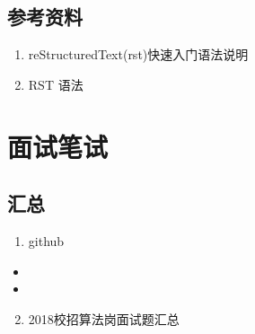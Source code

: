 \documentclass[letterpaper,10pt,english]{sphinxmanual}
\begin{document}
\subsection{参考资料}
\label{\detokenize{else/01_test_code:id1}}\begin{enumerate}
\item {} 
reStructuredText(rst)快速入门语法说明

\end{enumerate}
\begin{quote}

\end{quote}
\begin{enumerate}
\setcounter{enumi}{1}
\item {} 
RST 语法

\end{enumerate}
\begin{quote}

\end{quote}


\section{面试笔试}
\label{\detokenize{else/02_interview::doc}}\label{\detokenize{else/02_interview:id1}}

\subsection{汇总}
\label{\detokenize{else/02_interview:id2}}\begin{enumerate}
\item {} 
github

\end{enumerate}
\begin{itemize}
\item {} 

\item {} 

\end{itemize}
\begin{enumerate}
\setcounter{enumi}{1}
\item {} 
2018校招算法岗面试题汇总

\end{enumerate}
\begin{quote}

\end{quote}
\end{document}
